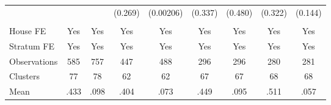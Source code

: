 {\begin{tabular}{l*{8}{c}}
                &         &         &  (0.269)&(0.00206)&  (0.337)&  (0.480)&  (0.322)&  (0.144)\\
                &         &         &         &         &         &         &         &         \\
House FE        &      Yes&      Yes&      Yes&      Yes&      Yes&      Yes&      Yes&      Yes\\
Stratum FE      &      Yes&      Yes&      Yes&      Yes&      Yes&      Yes&      Yes&      Yes\\
\midrule
Observations    &      585&      757&      447&      488&      296&      296&      280&      281\\
Clusters        &       77&       78&       62&       62&       67&       67&       68&       68\\
Mean            &     .433&     .098&     .404&     .073&     .449&     .095&     .511&     .057\\
\bottomrule
\end{tabular}
}
